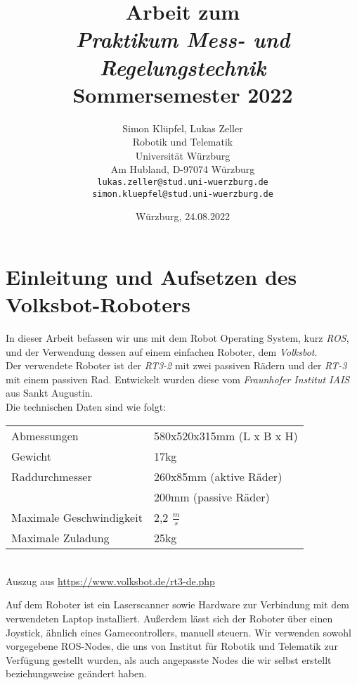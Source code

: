 \documentclass[11pt,a4paper]{article}
\begin{document}
\title{\Large\bf Arbeit zum \\ \textit{Praktikum Mess- und Regelungstechnik} \\ Sommersemester 2022}
\author{Simon Klüpfel, Lukas Zeller \\
  Robotik und Telematik \\
  Universität Würzburg\\
  Am Hubland, D-97074 Würzburg\\
\small \texttt{lukas.zeller@stud.uni-wuerzburg.de} \\
\small \texttt{simon.kluepfel@stud.uni-wuerzburg.de}}
\date{Würzburg, 24.08.2022}

\maketitle

\section{Einleitung und Aufsetzen des Volksbot-Roboters}
In dieser Arbeit befassen wir uns mit dem Robot Operating System, kurz \textit{ROS}, und der 
Verwendung dessen auf einem einfachen Roboter, dem \textit{Volksbot}. \\
Der verwendete Roboter ist der \textit{RT3-2} mit zwei passiven Rädern und der \textit{RT-3} mit einem passiven Rad.
Entwickelt wurden diese vom \textit{Fraunhofer Institut IAIS} aus Sankt Augustin. \\
Die technischen Daten sind wie folgt: \\
\vspace{-5mm}
\begin{center}
\begin{tabular}{| p{5cm} p{5cm} |}
  \hline
  Abmessungen & 580x520x315mm (L x B x H) \\
  Gewicht & 17kg \\
  
  Raddurchmesser & 260x85mm (aktive Räder) \\
   & 200mm (passive Räder) \\
  Maximale Geschwindigkeit & 2,2 $\frac{m}{s}$ \\
  
  Maximale Zuladung & 25kg \\
  \hline
\end{tabular} \\
\small{ Auszug aus \url{https://www.volksbot.de/rt3-de.php}}
\end{center}
Auf dem Roboter ist ein Laserscanner sowie Hardware zur Verbindung mit dem verwendeten
Laptop installiert. Außerdem lässt sich der Roboter über einen Joystick, ähnlich eines Gamecontrollers, manuell steuern. 
Wir verwenden sowohl vorgegebene ROS-Nodes, die uns von Institut für Robotik und Telematik zur Verfügung gestellt wurden, als auch angepasste Nodes die wir selbst erstellt beziehungsweise
geändert haben. 
\end{document}
